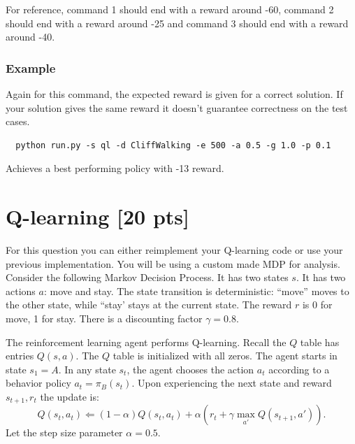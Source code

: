 \documentclass[a4paper]{article}
\theoremstyle{definition}
\begin{document}
For reference, command 1 should end with a reward around -60, command 2 should end with a reward around -25 and command 3 should end with a reward around -40.

\subsubsection*{Example}

Again for this command, the expected reward is given for a correct solution. If your solution gives the same reward it doesn't guarantee correctness on the test cases.

\begin{verbatim}
  python run.py -s ql -d CliffWalking -e 500 -a 0.5 -g 1.0 -p 0.1  
\end{verbatim}

Achieves a best performing policy with -13 reward.

\pagebreak
\section{Q-learning [20 pts]}
For this question you can either reimplement your Q-learning code or use your previous implementation. You will be using a custom made MDP for analysis. Consider the following Markov Decision Process.
It has two states $s$. It has two actions $a$: move and stay. The state transition is deterministic: ``move'' moves to the other state, while ``stay' stays at the current state. The reward $r$ is 0 for move,  1 for stay. There is a discounting factor $\gamma=0.8$.
\\


The reinforcement learning agent performs Q-learning.  Recall the $Q$ table has entries $Q(s,a)$. The $Q$ table is initialized with all zeros. The agent starts in state $s_1=A$. In any state $s_t$, the agent chooses the action $a_t$ according to a behavior policy $a_t = \pi_B(s_t)$. Upon experiencing the next state and reward $s_{t+1}, r_t$ the update is:
$$Q(s_t, a_t) \Leftarrow (1-\alpha) Q(s_t, a_t) + \alpha \left( r_t + \gamma \max_{a'} Q(s_{t+1}, a') \right).$$
Let the step size parameter $\alpha=0.5$.
\end{document}

